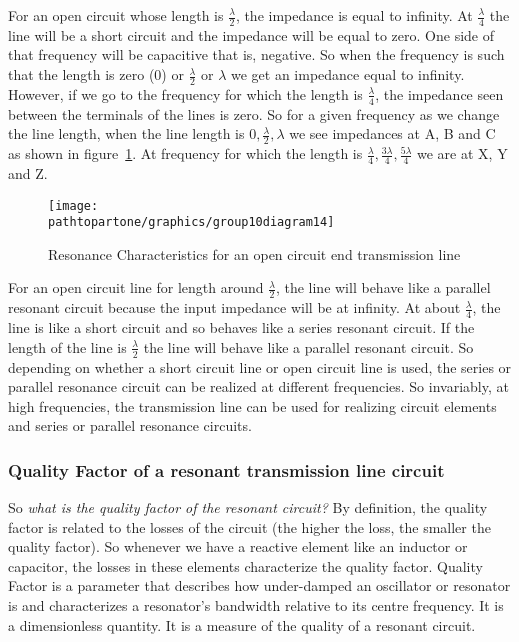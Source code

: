 For an open circuit whose length is $ \frac{\lambda}{2} $, the impedance is equal to infinity. At $ \frac{\lambda}{4} $ the line will be a short circuit and the impedance will be equal to zero. One side of that frequency will be capacitive that is, negative. So when the frequency is such that the length is zero (0) or $ \frac{\lambda}{2} $ or $ \lambda$ we get an impedance equal to infinity.
However, if we go to the frequency for which the length is $ \frac{\lambda}{4} $, the impedance seen between the terminals of the lines is zero. So for a given frequency as we change the line length, when the line
length is $0, \frac{\lambda}{2}, \lambda $ we see impedances at A, B and C as shown in figure~\ref{fig:group10diagram15}. At frequency for which the length is $ \frac{\lambda}{4}, \frac{3\lambda}{4}, \frac{5\lambda}{4}$ we are at X, Y and Z.
\begin{figure}[h]
\centering
\texttt{[image: \\pathtopartone/graphics/group10diagram14]}
\caption{Resonance Characteristics for an open circuit end transmission line}
\label{fig:group10diagram15}
\end{figure}

For an open circuit line for length around $ \frac{\lambda}{2} $, the line will behave like a parallel resonant circuit because the input impedance will be at infinity. At about $ \frac{\lambda}{4} $, the line is like a short circuit and so behaves like a series resonant circuit. If the length of the line is $ \frac{\lambda}{2} $ the line will behave like a parallel resonant circuit.
So depending on whether a short circuit line or open circuit line is used, the series or parallel resonance circuit can be realized at different frequencies. So invariably, at high frequencies, the transmission line can be used for realizing circuit elements and series or parallel resonance circuits.

\subsubsection{Quality Factor of a resonant transmission line circuit}
So \emph{what is the quality factor of the resonant circuit?} By definition, the quality factor is related to the losses of the circuit (the higher the loss, the smaller the quality factor). So whenever we have a reactive element like an inductor or capacitor, the losses in these elements characterize the quality factor. Quality Factor is a parameter that describes how under-damped an oscillator or resonator is and characterizes a resonator's bandwidth relative to its centre frequency. It is a dimensionless quantity. It is a measure of the quality of a resonant circuit. 

